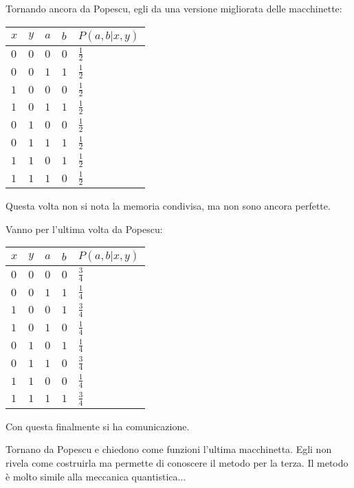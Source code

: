 Tornando ancora da Popescu, egli da una versione migliorata delle macchinette: \\
\begin{tabularx}{\textwidth}{XXXXX}
\toprule
$x$ & $y$ & $a$ & $b$ & $P\left(a,b|x,y\right)$ \\
\midrule
$0$ & $0$ & $0$ & $0$ & $\frac{1}{2}$ \\
$0$ & $0$ & $1$ & $1$ & $\frac{1}{2}$ \\
$1$ & $0$ & $0$ & $0$ & $\frac{1}{2}$ \\
$1$ & $0$ & $1$ & $1$ & $\frac{1}{2}$ \\
$0$ & $1$ & $0$ & $0$ & $\frac{1}{2}$ \\
$0$ & $1$ & $1$ & $1$ & $\frac{1}{2}$ \\
$1$ & $1$ & $0$ & $1$ & $\frac{1}{2}$ \\
$1$ & $1$ & $1$ & $0$ & $\frac{1}{2}$ \\
\bottomrule
\end{tabularx}
Questa volta non si nota la memoria condivisa, ma non sono ancora perfette.

Vanno per l'ultima volta da Popescu: \\
\begin{tabularx}{\textwidth}{XXXXX}
\toprule
$x$ & $y$ & $a$ & $b$ & $P\left(a,b|x,y\right)$ \\
\midrule
$0$ & $0$ & $0$ & $0$ & $\frac{3}{4}$ \\
$0$ & $0$ & $1$ & $1$ & $\frac{1}{4}$ \\
$1$ & $0$ & $0$ & $1$ & $\frac{3}{4}$ \\
$1$ & $0$ & $1$ & $0$ & $\frac{1}{4}$ \\
$0$ & $1$ & $0$ & $1$ & $\frac{1}{4}$ \\
$0$ & $1$ & $1$ & $0$ & $\frac{3}{4}$ \\
$1$ & $1$ & $0$ & $0$ & $\frac{1}{4}$ \\
$1$ & $1$ & $1$ & $1$ & $\frac{3}{4}$ \\
\bottomrule
\end{tabularx}
Con questa finalmente si ha comunicazione.


Tornano da Popescu e chiedono come funzioni l'ultima macchinetta. Egli non rivela come costruirla ma permette di conoscere il metodo per la terza. Il metodo è molto simile alla meccanica quantistica...

